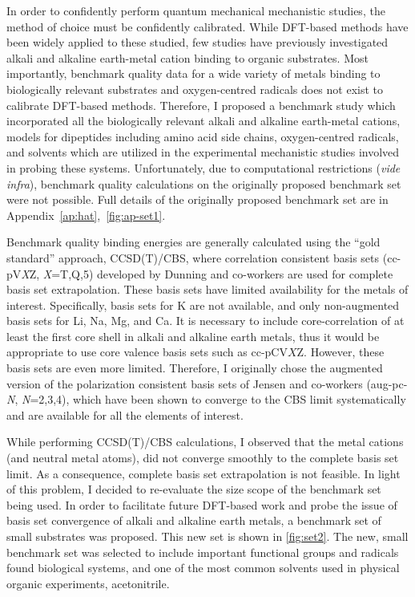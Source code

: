 In order to confidently perform quantum mechanical mechanistic studies, the method of choice must be confidently calibrated. While DFT-based methods have been widely applied to these studied, few studies have previously investigated alkali and alkaline earth-metal cation binding to organic substrates.\cite{Corral2003, Suarez2011, Siu2001, Baldauf2013} Most importantly, benchmark quality data for a wide variety of metals binding to biologically relevant substrates and oxygen-centred radicals does not exist to calibrate DFT-based methods. Therefore, I proposed a benchmark study which incorporated all the biologically relevant alkali and alkaline earth-metal cations, models for dipeptides including amino acid side chains, oxygen-centred radicals, and solvents which are utilized in the experimental mechanistic studies involved in probing these systems. Unfortunately, due to computational restrictions (\emph{vide infra}), benchmark quality calculations on the originally proposed benchmark set were not possible. Full details of the originally proposed benchmark set are in Appendix~\ref{ap:hat},~\ref{fig:ap-set1}.

Benchmark quality binding energies are generally calculated using the ``gold standard'' approach, CCSD(T)/CBS, where correlation consistent basis sets\cite{Marshall2011, Rezac2013} (cc-pV\emph{X}Z, \emph{X}=T,Q,5) developed by Dunning and\cite{Vydrov2006, Vydrov2006a} co-workers are used for complete basis set extrapolation. These basis sets have limited availability for the metals of interest. Specifically, basis sets for K are not available, and only non-augmented basis sets for Li, Na, Mg, and Ca. It is necessary to include core-correlation of at least the first core shell in alkali and alkaline earth metals, thus it would be appropriate to use core valence basis sets such as cc-pCV$X$Z.\cite{Peterson2002} However, these basis sets are even more limited. Therefore, I originally chose the augmented version of the polarization consistent basis sets of Jensen and co-workers\cite{Jensen2001, Jensen2002, Jensen2002a, Jensen2003}  (aug-pc-\emph{N}, \emph{N}=2,3,4), which have been shown to converge to the CBS limit systematically\cite{Kupka2007} and are available for all the elements of interest.

While performing CCSD(T)/CBS calculations, I observed that the metal cations (and neutral metal atoms), did not converge smoothly to the complete basis set limit. As a consequence, complete basis set extrapolation is not feasible. In light of this problem, I decided to re-evaluate the size scope of the benchmark set being used. In order to facilitate future DFT-based work and probe the issue of basis set convergence of alkali and alkaline earth metals, a benchmark set of small substrates was proposed. This new set is shown in \ref{fig:set2}. The new, small benchmark set was selected to include important functional groups and radicals found biological systems, and one of the most common solvents used in physical organic experiments, acetonitrile.

